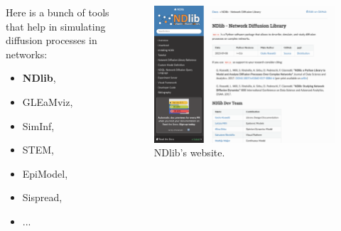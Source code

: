 \documentclass{beamer}
\begin{document}
\begin{frame}{\secname}
    \begin{columns}[T]
        \begin{column}{.35\textwidth}
            Here is a bunch of tools that help in simulating diffusion processes in networks:
            \begin{itemize}
                \item \textbf{NDlib}\cite{ndlib},
                \item GLEaMviz\cite{gleam},
                \item SimInf\cite{siminf},
                \item STEM\cite{stem},
                \item EpiModel\cite{jenness2018epimodel},
                \item Sispread\cite{sispread},
                \item ...
            \end{itemize}
        \end{column}
        \hfill
        \begin{column}{.60\textwidth}
            \begin{figure}[ht]
                \centering
                \includegraphics[width=1\textwidth]{figures/ndlib.png}
                \caption{NDlib's website.}
            \end{figure}
        \end{column}
    \end{columns}
\end{frame}
\end{document}
